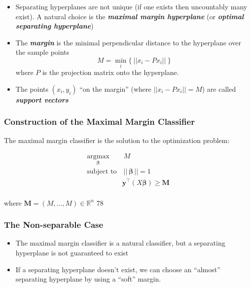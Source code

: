 \documentclass[11pt]{article}
\begin{document}
    \begin{itemize}
\item
  Separating hyperplanes are not unique (if one exists then uncountably
  many exist). A natural choice is the \textbf{\emph{maximal margin
  hyperplane}} (or \textbf{\emph{optimal separating hyperplane}})
\item
  The \textbf{\emph{margin}} is the minimal perpendicular distance to
  the hyperplane over the sample points
  \[ M = \underset{i}{\min}\{\ ||x_i - P x_i||\ \}\] where \(P\) is the
  projection matrix onto the hyperplane.
\item
  The points \((x_i, y_i)\) ``on the margin'' (where
  \(||x_i - P x_i|| = M\)) are called \textbf{\emph{support vectors}}
\end{itemize}

    \hypertarget{construction-of-the-maximal-margin-classifier}{%
\subsubsection{Construction of the Maximal Margin
Classifier}\label{construction-of-the-maximal-margin-classifier}}

    The maximal margin classifier is the solution to the optimization
problem:

\begin{align*}
\underset{\boldsymbol{\beta}}{\text{argmax}}&\ M\\
\text{subject to}&\ ||\,\boldsymbol{\beta}\,|| = 1\\
& \mathbf{y}^\top(X\boldsymbol{\beta}) \geqslant \mathbf{M}\\
\end{align*}

where \(\mathbf{M} = (M, \dots, M) \in \mathbb{R}^n\) 78 

    \hypertarget{the-non-separable-case}{%
\subsubsection{The Non-separable Case}\label{the-non-separable-case}}

    \begin{itemize}
\item
  The maximal margin classifier is a natural classifier, but a
  separating hyperplane is not guaranteed to exist
\item
  If a separating hyperplane doesn't exist, we can choose an ``almost''
  separating hyperplane by using a ``soft'' margin.
\end{itemize}
\end{document}
